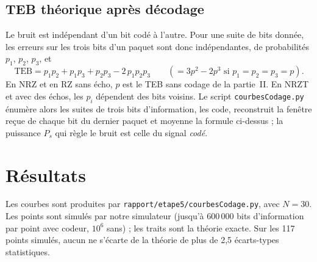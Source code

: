 \documentclass[11pt,a4paper]{article}
\begin{document}
\subsection{TEB théorique après décodage}\label{sec:theoriecodage}
Le bruit est indépendant d'un bit codé à l'autre. Pour une suite de bits donnée, les erreurs sur les trois bits d'un paquet sont donc indépendantes, de probabilités $p_1$, $p_2$, $p_3$, et
\[ \text{TEB} = p_1p_2 + p_1p_3 + p_2p_3 - 2\,p_1p_2p_3 \qquad (= 3p^2 - 2p^3 \text{ si } p_1 = p_2 = p_3 = p). \]
En NRZ et en RZ sans écho, $p$ est le TEB sans codage de la partie~II. En NRZT et avec des échos, les $p_i$ dépendent des bits voisins. Le script \texttt{courbesCodage.py} énumère alors les suites de trois bits d'information, les code, reconstruit la fenêtre reçue de chaque bit du dernier paquet et moyenne la formule ci-dessus ; la puissance $P_s$ qui règle le bruit est celle du signal \emph{codé}.

\section{Résultats}
Les courbes sont produites par \texttt{rapport/etape5/courbesCodage.py}, avec $N = 30$. Les points sont simulés par notre simulateur (jusqu'à 600\,000 bits d'information par point avec codeur, $10^6$ sans) ; les traits sont la théorie exacte. Sur les 117 points simulés, aucun ne s'écarte de la théorie de plus de 2,5 écarts-types statistiques.
\end{document}
